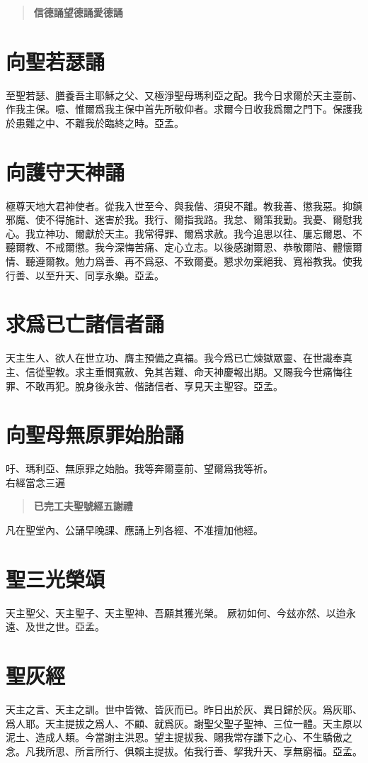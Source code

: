 \begin{quote}
\bfseries 信德誦\quad 望德誦\quad 愛德誦
\end{quote}

\section*{向聖若瑟誦}
至聖若瑟、膳養吾主耶穌之父、又極淨聖母瑪利亞之配。我今日求爾於天主臺前、作我主保。噫、惟爾爲我主保中首先所敬仰者。求爾今日收我爲爾之門下。保護我於患難之中、不離我於臨終之時。{\cspace}亞孟。

\section*{向護守天神誦}
極尊天地大君神使者。從我入世至今、與我偕、須臾不離。教我善、懲我惡。抑鎮邪魔、使不得施計、迷害於我。我行、爾指我路。我怠、爾策我勤。我憂、爾慰我心。我立神功、爾獻於天主。我常得罪、爾爲求赦。我今追思以往、屢忘爾恩、不聽爾教、不戒爾懲。我今深悔苦痛、定心立志。以後感謝爾恩、恭敬爾陪、體懷爾情、聽遵爾教。勉力爲善、再不爲惡、不致爾憂。懇求勿棄絕我、寬裕教我。使我行善、以至升天、同享永樂。{\cspace}亞孟。

\section*{求爲已亡諸信者誦}
天主生人、欲人在世立功、膺主預備之真福。我今爲已亡煉獄眾靈、在世識奉真主、信從聖教。求主垂憫寬赦、免其苦難、命天神慶報出期。又賜我今世痛悔往罪、不敢再犯。脫身後永苦、偕諸信者、享見天主聖容。{\cspace}亞孟。

\section*{向聖母無原罪始胎誦}
吁、瑪利亞、無原罪之始胎。我等奔爾臺前、望爾爲我等祈。\\ {\small 右經當念三遍}
\begin{quote}
\bfseries 已完工夫\quad 聖號經\quad  五謝禮
\end{quote}
{\small 凡在聖堂內、公誦早晚課、應誦上列各經、不准擅加他經。}

\section*{聖三光榮頌}
天主聖父、天主聖子、天主聖神、吾願其獲光榮。 厥初如何、今玆亦然、以迨永遠、及世之世。{\cspace}亞孟。

\section*{聖灰經}
天主之言、天主之訓。世中皆微、皆灰而已。昨日出於灰、異日歸於灰。爲灰耶、爲人耶。天主提拔之爲人、不顧、就爲灰。謝聖父聖子聖神、三位一體。天主原以泥土、造成人類。今當謝主洪恩。望主提拔我、賜我常存謙下之心、不生驕傲之念。凡我所思、所言所行、俱賴主提拔。佑我行善、挈我升天、享無窮福。{\cspace}亞孟。

